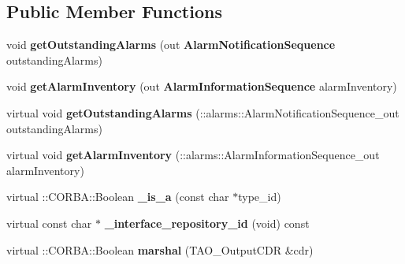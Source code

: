 \subsection*{Public Member Functions}
\begin{DoxyCompactItemize}
\item 
void {\bf get\+Outstanding\+Alarms} (out {\bf Alarm\+Notification\+Sequence} outstanding\+Alarms)
\item 
void {\bf get\+Alarm\+Inventory} (out {\bf Alarm\+Information\+Sequence} alarm\+Inventory)
\item 
virtual void {\bfseries get\+Outstanding\+Alarms} (\+::alarms\+::\+Alarm\+Notification\+Sequence\+\_\+out outstanding\+Alarms)\label{interfacealarms_1_1alarmInterface_ae4991357b713600b2249877d1b76f5f0}

\item 
virtual void {\bfseries get\+Alarm\+Inventory} (\+::alarms\+::\+Alarm\+Information\+Sequence\+\_\+out alarm\+Inventory)\label{interfacealarms_1_1alarmInterface_a9deaa02c57209a7d1776c2a5a4e76a16}

\item 
virtual \+::C\+O\+R\+B\+A\+::\+Boolean {\bfseries \+\_\+is\+\_\+a} (const char $\ast$type\+\_\+id)\label{interfacealarms_1_1alarmInterface_a33f2a4066795b3addb0039f3d0871c9a}

\item 
virtual const char $\ast$ {\bfseries \+\_\+interface\+\_\+repository\+\_\+id} (void) const \label{interfacealarms_1_1alarmInterface_ada3718fab0fd4e1d7fb307d97d64400c}

\item 
virtual \+::C\+O\+R\+B\+A\+::\+Boolean {\bfseries marshal} (T\+A\+O\+\_\+\+Output\+C\+DR \&cdr)\label{interfacealarms_1_1alarmInterface_ac8ff835008611dd8f422cee80de84729}

\end{DoxyCompactItemize}
